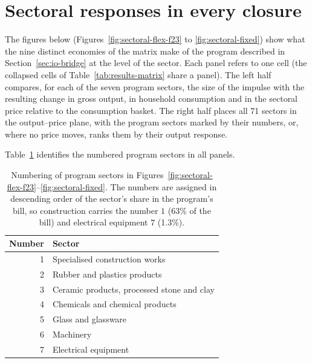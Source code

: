 \section{Sectoral responses in every closure}\label{app:sectoral-panels}

The figures below (Figures~\ref{fig:sectoral-flex-f23} to \ref{fig:sectoral-fixed}) show what the nine distinct economies of the matrix make of the program described in Section~\ref{sec:io-bridge} at the level of the sector.
Each panel refers to one cell (the collapsed cells of Table~\ref{tab:results-matrix} share a panel). The left half compares, for each of the seven program sectors, the size of the impulse with the resulting change in gross output, in household consumption and in the sectoral price relative to the consumption basket. The right half places all 71 sectors in the output--price plane, with the program sectors marked by their numbers, or, where no price moves, ranks them by their output response.

Table~\ref{tab:program-sector-key} identifies the numbered program sectors in all panels.

\begin{table}[htbp]
\centering
\small
\begin{tabular}{rl}
\toprule
Number & Sector \\
\midrule
1 & Specialised construction works \\
2 & Rubber and plastics products \\
3 & Ceramic products, processed stone and clay \\
4 & Chemicals and chemical products \\
5 & Glass and glassware \\
6 & Machinery \\
7 & Electrical equipment \\
\bottomrule
\end{tabular}
\caption{Numbering of program sectors in
Figures~\ref{fig:sectoral-flex-f23}--\ref{fig:sectoral-fixed}. The numbers are
assigned in descending order of the sector's share in the program's bill, so
construction carries the number $1$ (63\% of the bill) and electrical equipment $7$
(1.3\%).}
\label{tab:program-sector-key}
\end{table}

